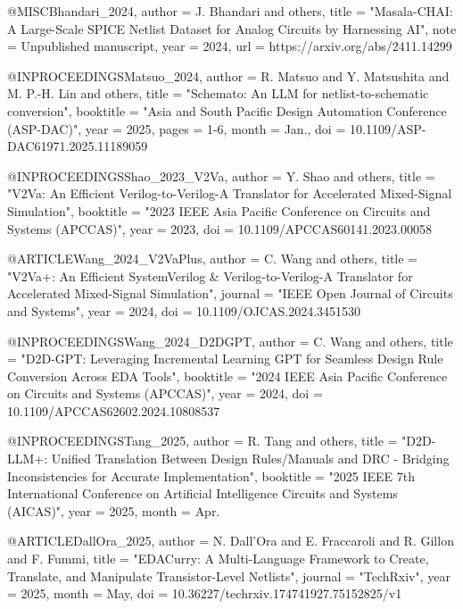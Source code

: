 \documentclass[conference]{IEEEtran}
\begin{document}
@MISC{Bhandari_2024,
    author      =   {J. {Bhandari} and others},
    title       =   "{Masala-CHAI: A Large-Scale {SPICE} Netlist Dataset for Analog Circuits by Harnessing {AI}}",
    note        =   {Unpublished manuscript},
    year        =   {2024},
    url         =   {https://arxiv.org/abs/2411.14299}
}

@INPROCEEDINGS{Matsuo_2024,
    author      =   {R. {Matsuo} and Y. {Matsushita} and M. P.-H. {Lin} and others},
    title       =   "{Schemato: An {LLM} for netlist-to-schematic conversion}",
    booktitle   =   "{Asia and South Pacific Design Automation Conference (ASP-DAC)}",
    year        =   {2025},
    pages       =   {1-6},
    month       =   {Jan.},
    doi         =   {10.1109/ASP-DAC61971.2025.11189059}
}

@INPROCEEDINGS{Shao_2023_V2Va,
    author      =   {Y. {Shao} and others},
    title       =   "{V2Va: An Efficient Verilog-to-Verilog-A Translator for Accelerated Mixed-Signal Simulation}",
    booktitle   =   "{2023 IEEE Asia Pacific Conference on Circuits and Systems (APCCAS)}",
    year        =   {2023},
    doi         =   {10.1109/APCCAS60141.2023.00058}
}

@ARTICLE{Wang_2024_V2VaPlus,
    author      =   {C. {Wang} and others},
    title       =   "{V2Va+: An Efficient SystemVerilog \& Verilog-to-Verilog-A Translator for Accelerated Mixed-Signal Simulation}",
    journal     =   "{IEEE Open Journal of Circuits and Systems}",
    year        =   {2024},
    doi         =   {10.1109/OJCAS.2024.3451530}
}

@INPROCEEDINGS{Wang_2024_D2DGPT,
    author      =   {C. {Wang} and others},
    title       =   "{D2D-GPT: Leveraging Incremental Learning {GPT} for Seamless Design Rule Conversion Across {EDA} Tools}",
    booktitle   =   "{2024 IEEE Asia Pacific Conference on Circuits and Systems (APCCAS)}",
    year        =   {2024},
    doi         =   {10.1109/APCCAS62602.2024.10808537}
}

@INPROCEEDINGS{Tang_2025,
    author      =   {R. {Tang} and others},
    title       =   "{D2D-LLM+: Unified Translation Between Design Rules/Manuals and {DRC} - Bridging Inconsistencies for Accurate Implementation}",
    booktitle   =   "{2025 IEEE 7th International Conference on Artificial Intelligence Circuits and Systems (AICAS)}",
    year        =   {2025},
    month       =   {Apr.}
}

@ARTICLE{DallOra_2025,
    author      =   {N. {Dall’Ora} and E. {Fraccaroli} and R. {Gillon} and F. {Fummi}},
    title       =   "{EDACurry: A Multi-Language Framework to Create, Translate, and Manipulate Transistor-Level Netlists}",
    journal     =   "{TechRxiv}",
    year        =   {2025},
    month       =   {May},
    doi         =   {10.36227/techrxiv.174741927.75152825/v1}
}
\end{document}
